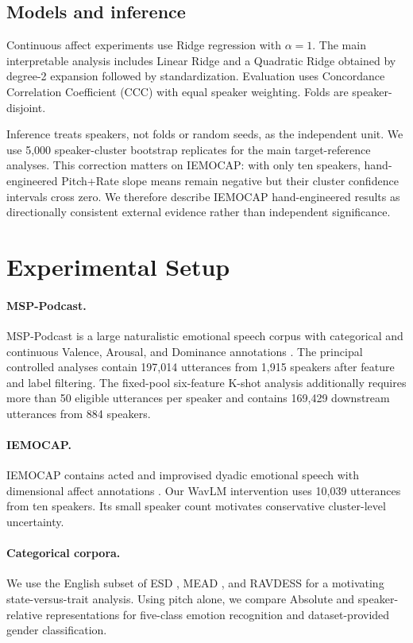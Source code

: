 \documentclass[11pt]{article}
\begin{document}
\subsection{Models and inference}

Continuous affect experiments use Ridge regression with $\alpha=1$.
The main interpretable analysis includes Linear Ridge and a Quadratic Ridge obtained by degree-2 expansion followed by standardization.
Evaluation uses Concordance Correlation Coefficient (CCC) \citep{lin1989ccc} with equal speaker weighting.
Folds are speaker-disjoint.

Inference treats speakers, not folds or random seeds, as the independent unit.
We use 5,000 speaker-cluster bootstrap replicates for the main target-reference analyses.
This correction matters on IEMOCAP: with only ten speakers, hand-engineered Pitch+Rate slope means remain negative but their cluster confidence intervals cross zero.
We therefore describe IEMOCAP hand-engineered results as directionally consistent external evidence rather than independent significance.

\section{Experimental Setup}

\paragraph{MSP-Podcast.}
MSP-Podcast is a large naturalistic emotional speech corpus with categorical and continuous Valence, Arousal, and Dominance annotations \citep{lotfian2019msp,busso2026msppodcast}.
The principal controlled analyses contain 197,014 utterances from 1,915 speakers after feature and label filtering.
The fixed-pool six-feature K-shot analysis additionally requires more than 50 eligible utterances per speaker and contains 169,429 downstream utterances from 884 speakers.

\paragraph{IEMOCAP.}
IEMOCAP contains acted and improvised dyadic emotional speech with dimensional affect annotations \citep{busso2008iemocap}.
Our WavLM intervention uses 10,039 utterances from ten speakers.
Its small speaker count motivates conservative cluster-level uncertainty.

\paragraph{Categorical corpora.}
We use the English subset of ESD \citep{zhou2021esd}, MEAD \citep{wang2020mead}, and RAVDESS \citep{livingstone2018ravdess} for a motivating state-versus-trait analysis.
Using pitch alone, we compare Absolute and speaker-relative representations for five-class emotion recognition and dataset-provided gender classification.
\end{document}
